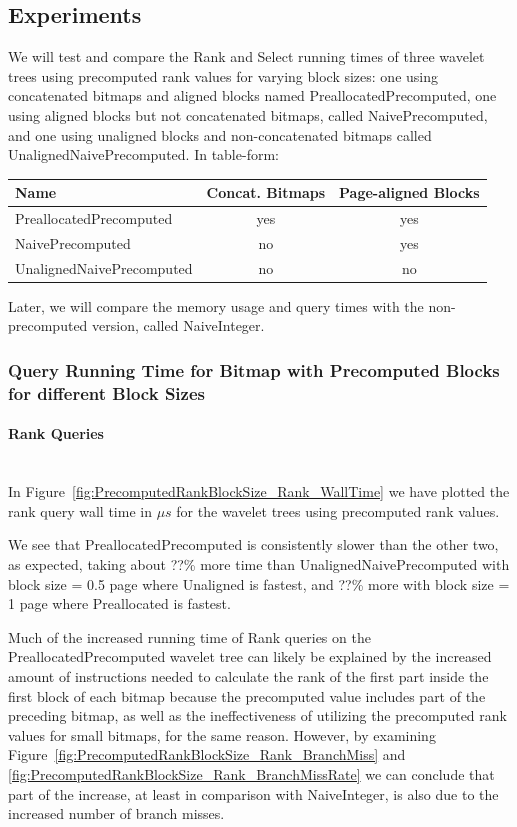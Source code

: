 \subsection{Experiments}
We will test and compare the Rank and Select running times of three wavelet trees using precomputed rank values for varying block sizes: one using concatenated bitmaps and aligned blocks named PreallocatedPrecomputed, one using aligned blocks but not concatenated bitmaps, called NaivePrecomputed,
and one using unaligned blocks and non-concatenated bitmaps called UnalignedNaivePrecomputed.
In table-form:\\
\begin{tabular}{|l|c|c|}
\hline
Name							& Concat. Bitmaps	& Page-aligned Blocks	\\ \hline
PreallocatedPrecomputed		& yes				& yes					\\ \hline
NaivePrecomputed				& no					& yes					\\ \hline
UnalignedNaivePrecomputed	& no					& no						\\ \hline
\end{tabular}

Later, we will compare the memory usage and query times with the non-precomputed version, called NaiveInteger.

\subsubsection{Query Running Time for Bitmap with Precomputed Blocks for different Block Sizes}
\label{sec:queryRunTimePrecomputedBlockSizes}

\paragraph{Rank Queries}~\\
In Figure~\ref{fig:PrecomputedRankBlockSize_Rank_WallTime} we have plotted the rank query wall time in $\mu s$ for the wavelet trees using precomputed rank values.

We see that PreallocatedPrecomputed is consistently slower than the other two, as expected, taking about ??\% more time than UnalignedNaivePrecomputed with block size = 0.5 page where Unaligned is fastest, and ??\% more with block size = 1 page where Preallocated is fastest.

Much of the increased running time of Rank queries on the PreallocatedPrecomputed wavelet tree can likely be explained by the increased amount of instructions needed to calculate the rank of the first part inside the first block of each bitmap because the precomputed value includes part of the preceding bitmap, as well as the ineffectiveness of utilizing the precomputed rank values for small bitmaps, for the same reason.
However, by examining Figure~\ref{fig:PrecomputedRankBlockSize_Rank_BranchMiss} and \ref{fig:PrecomputedRankBlockSize_Rank_BranchMissRate} we can conclude that part of the increase, at least in comparison with NaiveInteger, is also due to the increased number of branch misses.

